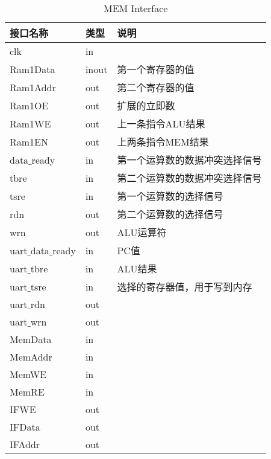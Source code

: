 \begin{table}[H]
\begin{center}
\renewcommand{\arraystretch}{1.3}
\small
\caption{MEM Interface}
\label{tab:treatments}
\begin{tabular}{|p{3cm}<{\centering}|p{1.4cm}<{\centering}|p{7cm}<{\centering}|}
\hline
接口名称 & 类型 & 说明 \\
\hline
clk & in & \\
\hline
Ram1Data & inout & 第一个寄存器的值 \\
\hline
Ram1Addr & out & 第二个寄存器的值 \\
\hline
Ram1OE & out & 扩展的立即数 \\
\hline
Ram1WE & out & 上一条指令ALU结果 \\
\hline
Ram1EN & out & 上两条指令MEM结果 \\
\hline
data$\_$ready & in & 第一个运算数的数据冲突选择信号 \\
\hline
tbre & in & 第二个运算数的数据冲突选择信号 \\
\hline
tsre & in & 第一个运算数的选择信号 \\
\hline
rdn & out &  第二个运算数的选择信号 \\
\hline
wrn & out & ALU运算符 \\
\hline
uart$\_$data$\_$ready & in & PC值 \\
\hline
uart$\_$tbre & in & ALU结果 \\
\hline
uart$\_$tsre & in & 选择的寄存器值，用于写到内存 \\
\hline
uart$\_$rdn & out & \\
\hline
uart$\_$wrn & out & \\
\hline
MemData & in & \\
\hline
MemAddr & in & \\
\hline
MemWE & in & \\
\hline
MemRE & in & \\
\hline
IFWE & out & \\
\hline 
IFData & out & \\
\hline
IFAddr & out & \\
\hline
\end{tabular}
\end{center}
\end{table}



